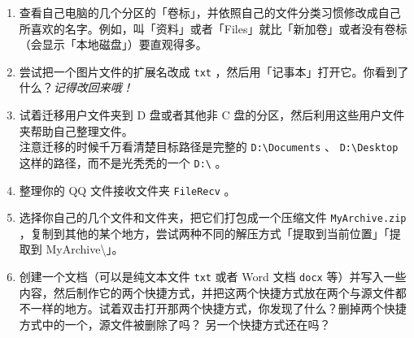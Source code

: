 \practice

\begin{enumerate}
  \item 查看自己电脑的几个分区的「卷标」，并依照自己的文件分类习惯修改成自己所喜欢的名字。例如，叫「资料」或者「Files」就比「新加卷」或者没有卷标（会显示「本地磁盘」）要直观得多。
  \item 尝试把一个图片文件的扩展名改成 \verb|txt| ，然后用「记事本」打开它。你看到了什么？\textit{记得改回来哦！}
  \item 试着迁移用户文件夹到 D 盘或者其他非 C 盘的分区，然后利用这些用户文件夹帮助自己整理文件。\\
    注意迁移的时候千万看清楚目标路径是完整的 \verb|D:\Documents| 、 \verb|D:\Desktop| 这样的路径，而不是光秃秃的一个 \verb|D:\| 。
  \item 整理你的 QQ 文件接收文件夹 \verb|FileRecv| 。
  \item 选择你自己的几个文件和文件夹，把它们打包成一个压缩文件 \verb|MyArchive.zip| ，复制到其他的某个地方，尝试两种不同的解压方式「提取到当前位置」「提取到 MyArchive\textbackslash{}」。
  \item 创建一个文档（可以是纯文本文件 \verb|txt| 或者 Word 文档 \verb|docx| 等）并写入一些内容，然后制作它的两个快捷方式，并把这两个快捷方式放在两个与源文件都不一样的地方。试着双击打开那两个快捷方式，你发现了什么？删掉两个快捷方式中的一个，源文件被删除了吗？
    另一个快捷方式还在吗？
\end{enumerate}